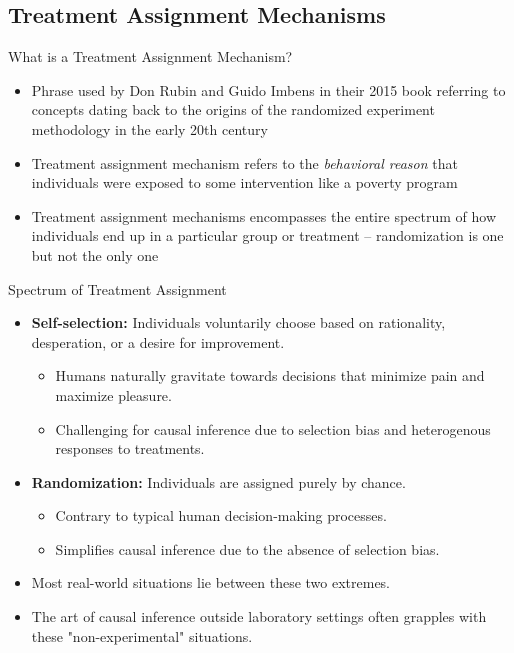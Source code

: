 \documentclass{beamer}
\begin{document}
\subsection{Treatment Assignment Mechanisms}


\begin{frame}{What is a Treatment Assignment Mechanism?}
\begin{itemize}
\item Phrase used by Don Rubin and Guido Imbens in their 2015 book referring to concepts dating back to the origins of the randomized experiment methodology in the early 20th century
\item Treatment assignment mechanism refers to the \emph{behavioral reason} that individuals were exposed to some intervention like a poverty program
\item Treatment assignment mechanisms encompasses the entire spectrum of how individuals end up in a particular group or treatment -- randomization is one but not the only one
\end{itemize}
\end{frame}

\begin{frame}{Spectrum of Treatment Assignment}
\begin{itemize}
\item \textbf{Self-selection:} Individuals voluntarily choose based on rationality, desperation, or a desire for improvement.
\begin{itemize}
\item Humans naturally gravitate towards decisions that minimize pain and maximize pleasure.
\item Challenging for causal inference due to selection bias and heterogenous responses to treatments.
\end{itemize}
\item \textbf{Randomization:} Individuals are assigned purely by chance.
\begin{itemize}
\item Contrary to typical human decision-making processes.
\item Simplifies causal inference due to the absence of selection bias.
\end{itemize}
\item Most real-world situations lie between these two extremes.
\item The art of causal inference outside laboratory settings often grapples with these "non-experimental" situations.
\end{itemize}
\end{frame}
\end{document}
